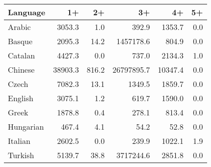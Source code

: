 \begin{tabular}{lrrrrr}
\toprule
 Language   &      1+ &    2+ &         3+ &      4+ &   5+ \\
\midrule
 Arabic     &  \num{3053.3} &   \num{1.0} &      \num{392.9} &  \num{1353.7} &  \num{0.0} \\
 Basque     &  \num{2095.3} &  \num{14.2} &  \num{1457178.6} &   \num{804.9} &  \num{0.0} \\
 Catalan    &  \num{4427.3} &   \num{0.0} &      \num{737.0} &  \num{2134.3} &  \num{1.0} \\
 Chinese    & \num{38903.3} & \num{816.2} & \num{26797895.7} & \num{10347.4} &  \num{0.0} \\
 Czech      &  \num{7082.3} &  \num{13.1} &     \num{1349.5} &  \num{1859.7} &  \num{0.0} \\
 English    &  \num{3075.1} &   \num{1.2} &      \num{619.7} &  \num{1590.0} &  \num{0.0} \\
 Greek      &  \num{1878.8} &   \num{0.4} &      \num{278.1} &   \num{813.4} &  \num{0.0} \\
 Hungarian  &   \num{467.4} &   \num{4.1} &       \num{54.2} &    \num{52.8} &  \num{0.0} \\
 Italian    &  \num{2602.5} &   \num{0.0} &      \num{239.9} &  \num{1022.1} &  \num{1.9} \\
 Turkish    &  \num{5139.7} &  \num{38.8} &  \num{3717244.6} &  \num{2851.8} &  \num{0.0} \\
\bottomrule
\end{tabular}